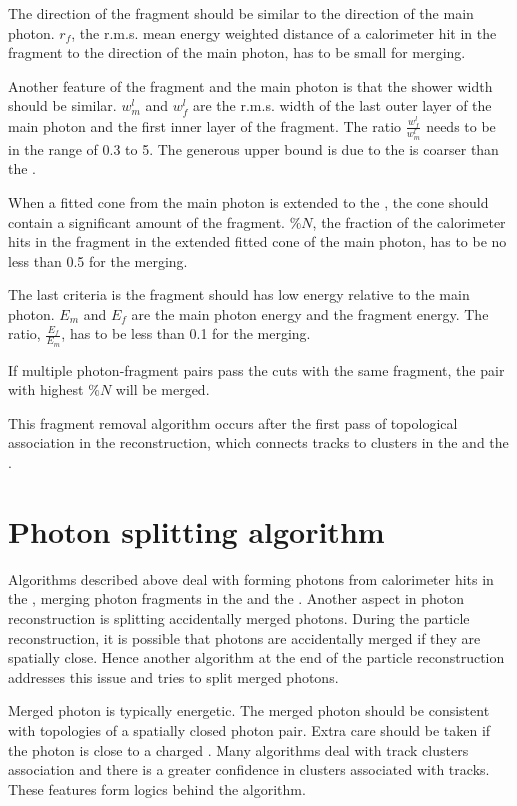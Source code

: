 The direction of the fragment should be similar to the direction of the main photon. $r_f$, the r.m.s. mean energy weighted distance of a calorimeter hit in the fragment to the direction of the main photon, has to be small for merging.

Another feature of the fragment and the main photon is that the shower width should be similar. $w^l_m$ and $w^l_f$ are the r.m.s. width of the last outer layer of the main photon and the first inner layer of the fragment. The ratio $\frac{w^l_f}{w^l_m}$ needs to be in the range of 0.3 to 5. The generous upper bound is due to the \HCAL is coarser than the \ECAL.

When a fitted cone from the main photon is extended to the \HCAL, the cone should contain a significant amount of the fragment. $\%{N}$, the fraction of the calorimeter hits in the fragment in the extended fitted cone of the main photon, has to be no less than 0.5 for the merging.

The last criteria is the fragment should has low energy relative to the main photon. $E_m$ and $E_f$ are the main photon energy and the fragment energy. The ratio, $\frac{E_f}{E_m}$, has to be less than 0.1 for the merging.

If multiple photon-fragment pairs pass the cuts with the same fragment, the pair with highest $\%{N}$ will be merged.

This \HCAL fragment removal algorithm occurs after the first pass of topological association in the reconstruction, which connects tracks to clusters in the \ECAL and the \HCAL.

\section{Photon splitting algorithm}
\label{sec:photonSplitting}

Algorithms described above deal with forming photons from calorimeter hits in the \ECAL, merging photon fragments in the \ECAL and the \HCAL. Another aspect in photon reconstruction is splitting accidentally merged photons. During the particle reconstruction, it is possible that photons are accidentally merged if they are spatially close. Hence another algorithm at the end of the particle reconstruction addresses this issue and tries to split merged photons.

Merged photon is typically energetic. The merged photon should be consistent with topologies of a spatially closed photon pair. Extra care should be taken if the photon is close to a charged \PFO. Many \pandora algorithms deal with track clusters association and there is a greater confidence in clusters associated with tracks. These features form logics behind the algorithm.

